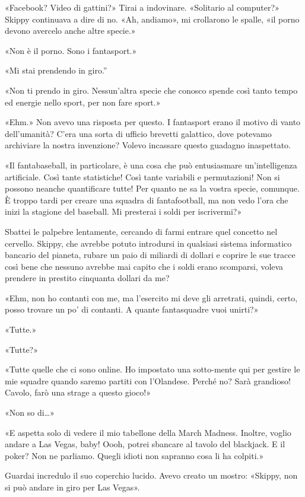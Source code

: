«Facebook? Video di gattini?» Tirai a indovinare. «Solitario al
computer?» Skippy continuava a dire di no. «Ah, andiamo», mi crollarono
le spalle, «il porno devono avercelo anche altre specie.»

«Non è il porno. Sono i fantasport.»

«Mi stai prendendo in giro.''

«Non ti prendo in giro. Nessun'altra specie che conosco spende così
tanto tempo ed energie nello sport, per non fare sport.»

«Ehm.» Non avevo una risposta per questo. I fantasport erano il motivo
di vanto dell'umanità? C'era una sorta di ufficio brevetti galattico,
dove potevamo archiviare la nostra invenzione? Volevo incassare questo
guadagno inaspettato.

«Il fantabaseball, in particolare, è una cosa che può entusiasmare
un'intelligenza artificiale. Così tante statistiche! Così tante
variabili e permutazioni! Non si possono neanche quantificare tutte! Per
quanto ne sa la vostra specie, comunque. È troppo tardi per creare una
squadra di fantafootball, ma non vedo l'ora che inizi la stagione del
baseball. Mi presterai i soldi per iscrivermi?»

Sbattei le palpebre lentamente, cercando di farmi entrare quel concetto
nel cervello. Skippy, che avrebbe potuto introdursi in qualsiasi sistema
informatico bancario del pianeta, rubare un paio di miliardi di dollari
e coprire le sue tracce così bene che nessuno avrebbe mai capito che i
soldi erano scomparsi, voleva prendere in prestito cinquanta dollari da
me?

«Ehm, non ho contanti con me, ma l'esercito mi deve gli arretrati,
quindi, certo, posso trovare un po' di contanti. A quante fantasquadre
vuoi unirti?»

«Tutte.»

«Tutte?»

«Tutte quelle che ci sono online. Ho impostato una sotto-mente qui per
gestire le mie squadre quando saremo partiti con l'Olandese. Perché no?
Sarà grandioso! Cavolo, farò una strage a questo gioco!»

«Non so di\ldots»

«E aspetta solo di vedere il mio tabellone della March Madness. Inoltre,
voglio andare a Las Vegas, baby! Oooh, potrei sbancare al tavolo del
blackjack. E il poker? Non ne parliamo. Quegli idioti non sapranno cosa
li ha colpiti.»

Guardai incredulo il suo coperchio lucido. Avevo creato un mostro:
«Skippy, non si può andare in giro per Las Vegas».

